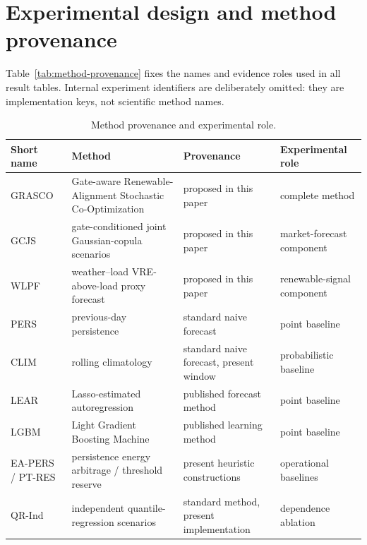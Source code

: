 \documentclass[11pt,a4paper]{article}
\begin{document}
\section{Experimental design and method provenance}

Table~\ref{tab:method-provenance} fixes the names and evidence roles used in
all result tables.  Internal experiment identifiers are deliberately omitted:
they are implementation keys, not scientific method names.

\begin{table}[htbp]
  \centering
  \footnotesize
  \caption{Method provenance and experimental role.}
  \setlength{\tabcolsep}{3pt}
  \begin{tabular}{>{\raggedright\arraybackslash}p{}
                  >{\raggedright\arraybackslash}p{}
                  >{\raggedright\arraybackslash}p{}
                  >{\raggedright\arraybackslash}p{}}
    \toprule
    Short name & Method & Provenance & Experimental role \\
    \midrule
    GRASCO
      & Gate-aware Renewable-Alignment Stochastic Co-Optimization
      & proposed in this paper & complete method \\
    GCJS
      & gate-conditioned joint Gaussian-copula scenarios
      & proposed in this paper & market-forecast component \\
    WLPF
      & weather--load VRE-above-load proxy forecast
      & proposed in this paper & renewable-signal component \\
    PERS
      & previous-day persistence~\cite{murphy1992}
      & standard naive forecast & point baseline \\
    CLIM
      & rolling climatology~\cite{murphy1992}
      & standard naive forecast, present window & probabilistic baseline \\
    LEAR
      & Lasso-estimated autoregression~\cite{zielweron2018}
      & published forecast method & point baseline \\
    LGBM
      & Light Gradient Boosting Machine~\cite{ke2017lightgbm}
      & published learning method & point baseline \\
    EA-PERS / PT-RES
      & persistence energy arbitrage / threshold reserve~\cite{murphy1992}
      & present heuristic constructions & operational baselines \\
    QR-Ind
      & independent quantile-regression scenarios~\cite{koenker1978}
      & standard method, present implementation & dependence ablation \\

\end{tabular}
\end{table}
\end{document}
